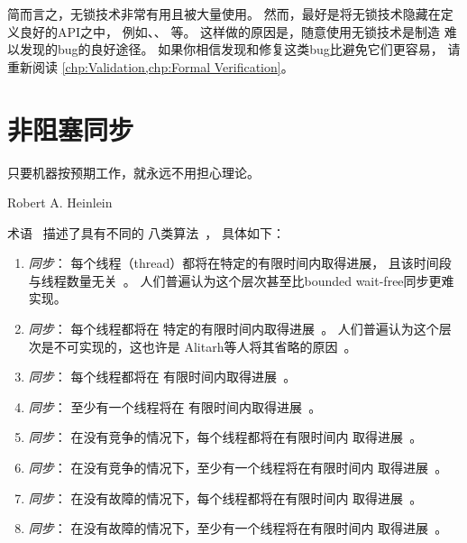 简而言之，无锁技术非常有用且被大量使用。
然而，最好是将无锁技术隐藏在定义良好的API之中，
例如、、
等。
这样做的原因是，随意使用无锁技术是制造
难以发现的bug的良好途径。
如果你相信发现和修复这类bug比避免它们更容易，
请重新阅读
\cref{chp:Validation,chp:Formal Verification}。

\section{非阻塞同步}
\label{sec:advsync:Non-Blocking Synchronization}
%
\epigraph{只要机器按预期工作，就永远不用担心理论。}
	 {Robert A. Heinlein}

术语~\cite{MauriceHerlihy90a}
描述了具有不同\emph{}的
八类算法~\cite{DanAlitarh2013PracticalProgress}，
具体如下：

\begin{enumerate}
\item	\emph{同步}：
	每个线程（thread）都将在特定的有限时间内取得进展，
	且该时间段与线程数量无关~\cite{HerlihyShavit2008Textbook}。
	人们普遍认为这个层次甚至比bounded wait-free同步更难实现。
\item	\emph{同步}：
	每个线程都将在
	特定的有限时间内取得进展~\cite{Herlihy91}。
	人们普遍认为这个层次是不可实现的，这也许是
	Alitarh等人将其省略的原因~\cite{DanAlitarh2013PracticalProgress}。
\item	\emph{同步}：
	每个线程都将在
	有限时间内取得进展~\cite{Herlihy93}。
\item	\emph{同步}：
	至少有一个线程将在
	有限时间内取得进展~\cite{Herlihy93}。
\item	\emph{同步}：
	在没有竞争的情况下，每个线程都将在有限时间内
	取得进展~\cite{HerlihyLM03}。
\item	\emph{同步}：
	在没有竞争的情况下，至少有一个线程将在有限时间内
	取得进展~\cite{DanAlitarh2013PracticalProgress}。
\item	\emph{同步}：
	在没有故障的情况下，每个线程都将在有限时间内
	取得进展~\cite{DanAlitarh2013PracticalProgress}。
\item	\emph{同步}：
	在没有故障的情况下，至少有一个线程将在有限时间内
	取得进展~\cite{DanAlitarh2013PracticalProgress}。
\end{enumerate}

